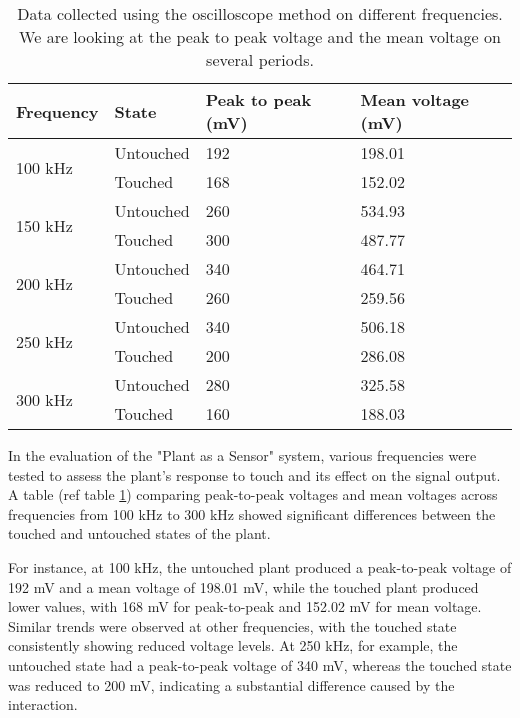 \begin{table}[h!]
    \begin{tabular}{|l|lll|}
        \hline
        Frequency                & State     & Peak to peak (mV) & Mean voltage (mV) \\ \hline
        \multirow{2}{*}{100 kHz} & Untouched & 192               & 198.01            \\
                                 & Touched   & 168               & 152.02            \\ \hline
        \multirow{2}{*}{150 kHz} & Untouched & 260               & 534.93            \\
                                 & Touched   & 300               & 487.77            \\ \hline
        \multirow{2}{*}{200 kHz} & Untouched & 340               & 464.71            \\
                                 & Touched   & 260               & 259.56            \\ \hline
        \multirow{2}{*}{250 kHz} & Untouched & 340               & 506.18            \\
                                 & Touched   & 200               & 286.08            \\ \hline
        \multirow{2}{*}{300 kHz} & Untouched & 280               & 325.58            \\
                                 & Touched   & 160               & 188.03            \\ \hline
    \end{tabular}
    \caption{Data collected using the oscilloscope method on different frequencies. We are looking at the peak to peak voltage and the mean voltage on several periods.}
    \label{tab:sum_up_data_oscil}
\end{table}

In the evaluation of the "Plant as a Sensor" system, various frequencies were tested to assess the plant's response to touch and its effect on the signal output. A table (ref table \ref{tab:sum_up_data_oscil}) comparing peak-to-peak voltages and mean voltages across frequencies from 100 kHz to 300 kHz showed significant differences between the touched and untouched states of the plant.

For instance, at 100 kHz, the untouched plant produced a peak-to-peak voltage of 192 mV and a mean voltage of 198.01 mV, while the touched plant produced lower values, with 168 mV for peak-to-peak and 152.02 mV for mean voltage. Similar trends were observed at other frequencies, with the touched state consistently showing reduced voltage levels. At 250 kHz, for example, the untouched state had a peak-to-peak voltage of 340 mV, whereas the touched state was reduced to 200 mV, indicating a substantial difference caused by the interaction.

